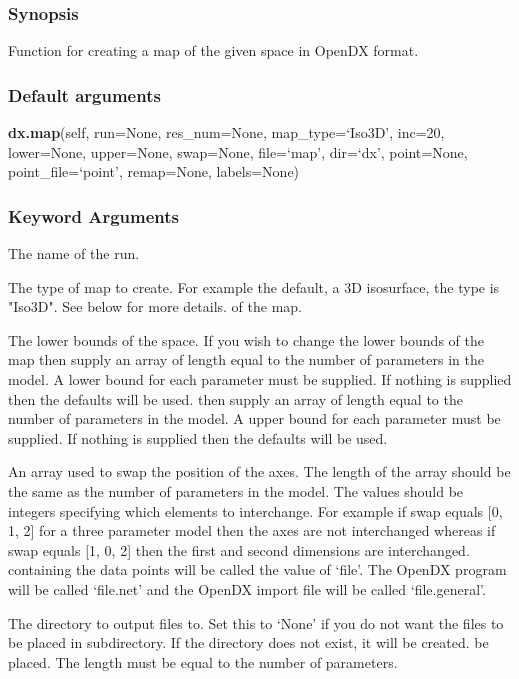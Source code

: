 \subsubsection{Synopsis}

Function for creating a map of the given space in OpenDX format.

\subsubsection{Default arguments}

\textsf{\textbf{dx.map}(self, run=None, res\_num=None, map\_type=`Iso3D', inc=20, lower=None, upper=None, swap=None, file=`map', dir=`dx', point=None, point\_file=`point', remap=None, labels=None)}


\subsubsection{Keyword Arguments}

  The name of the run.

  The type of map to create.  For example the default, a 3D isosurface, the type is "Iso3D".  See below for more details.
of the map.

  The lower bounds of the space.  If you wish to change the lower bounds of the map then supply an array of length equal to the number of parameters in the model.  A lower bound for each parameter must be supplied.  If nothing is supplied then the defaults will be used.
then supply an array of length equal to the number of parameters in the model.  A upper
bound for each parameter must be supplied.  If nothing is supplied then the defaults will
be used.

  An array used to swap the position of the axes.  The length of the array should be the same as the number of parameters in the model.  The values should be integers specifying which elements to interchange.  For example if swap equals [0, 1, 2] for a three parameter model then the axes are not interchanged whereas if swap equals [1, 0, 2] then the first and second dimensions are interchanged.
containing the data points will be called the value of `file'.  The OpenDX program will be
called `file.net' and the OpenDX import file will be called `file.general'.

  The directory to output files to.  Set this to `None' if you do not want the files to be placed in subdirectory.  If the directory does not exist, it will be created.
be placed.  The length must be equal to the number of parameters.

